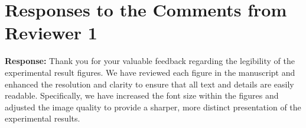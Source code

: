 \documentclass[a4paper,twoside,11pt,dvipsnames]{reviewresponse}
\begin{document}




\section{Responses to the Comments from Reviewer 1}


\textbf{Response:} Thank you for your valuable feedback regarding the legibility of the experimental result figures. We have reviewed each figure in the manuscript and enhanced the resolution and clarity to ensure that all text and details are easily readable. Specifically, we have increased the font size within the figures and adjusted the image quality to provide a sharper, more distinct presentation of the experimental results.



\end{document}
